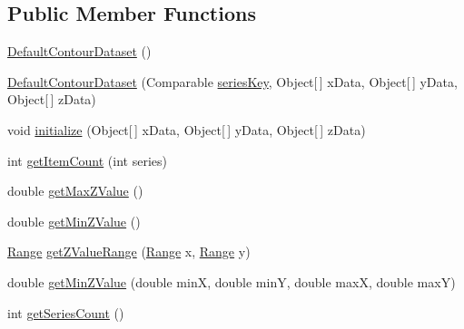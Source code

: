 \subsection*{Public Member Functions}
\begin{DoxyCompactItemize}
\item 
\mbox{\hyperlink{classorg_1_1jfree_1_1data_1_1contour_1_1_default_contour_dataset_a4e24bb86cfaef77d14c5c2ab8ec077bf}{Default\+Contour\+Dataset}} ()
\item 
\mbox{\hyperlink{classorg_1_1jfree_1_1data_1_1contour_1_1_default_contour_dataset_acbca185d7dbfb27891f3328cfad99a87}{Default\+Contour\+Dataset}} (Comparable \mbox{\hyperlink{classorg_1_1jfree_1_1data_1_1contour_1_1_default_contour_dataset_a2a44f861cc9da126f4969b4b80c35ad6}{series\+Key}}, Object\mbox{[}$\,$\mbox{]} x\+Data, Object\mbox{[}$\,$\mbox{]} y\+Data, Object\mbox{[}$\,$\mbox{]} z\+Data)
\item 
void \mbox{\hyperlink{classorg_1_1jfree_1_1data_1_1contour_1_1_default_contour_dataset_aeb6067364291f3fdf4dd53b27da75304}{initialize}} (Object\mbox{[}$\,$\mbox{]} x\+Data, Object\mbox{[}$\,$\mbox{]} y\+Data, Object\mbox{[}$\,$\mbox{]} z\+Data)
\item 
int \mbox{\hyperlink{classorg_1_1jfree_1_1data_1_1contour_1_1_default_contour_dataset_a8a4a746f281fa9d20fbad3f339063549}{get\+Item\+Count}} (int series)
\item 
double \mbox{\hyperlink{classorg_1_1jfree_1_1data_1_1contour_1_1_default_contour_dataset_a168e0cef5e2f7695f22b2af5f4808b57}{get\+Max\+Z\+Value}} ()
\item 
double \mbox{\hyperlink{classorg_1_1jfree_1_1data_1_1contour_1_1_default_contour_dataset_aab57c6d1cdd13d5574e3fd0170fce307}{get\+Min\+Z\+Value}} ()
\item 
\mbox{\hyperlink{classorg_1_1jfree_1_1data_1_1_range}{Range}} \mbox{\hyperlink{classorg_1_1jfree_1_1data_1_1contour_1_1_default_contour_dataset_a516b578d400a06e81eb12e13c2146e59}{get\+Z\+Value\+Range}} (\mbox{\hyperlink{classorg_1_1jfree_1_1data_1_1_range}{Range}} x, \mbox{\hyperlink{classorg_1_1jfree_1_1data_1_1_range}{Range}} y)
\item 
double \mbox{\hyperlink{classorg_1_1jfree_1_1data_1_1contour_1_1_default_contour_dataset_a75c88aa0192db75d737896d6882a05b1}{get\+Min\+Z\+Value}} (double minX, double minY, double maxX, double maxY)
\item 
int \mbox{\hyperlink{classorg_1_1jfree_1_1data_1_1contour_1_1_default_contour_dataset_a25377a7f8c950d69b5da0a2ad0ed9841}{get\+Series\+Count}} ()

\end{DoxyCompactItemize}
